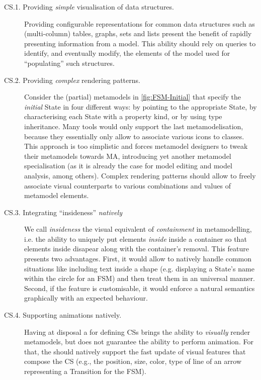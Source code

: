 \begin{description}
   \item[CS.1. Providing \emph{simple} visualisation of data struc\-tures.]
   Pro\-vi\-ding configurable representations for common data structures such as
   (multi-column) tables, graphs, sets and lists present the benefit of rapidly
   presenting information from a model. This ability should rely on queries to
   identify, and eventually modify, the elements of the model used for ``populating''
   such structures. 

	\item[CS.2. Providing \emph{complex} rendering patterns.]
   Consider the (partial) meta\-models in \autoref{fig:FSM-Initial} that
   specify the \emph{initial} \textsf{State} in four different ways: by pointing
   to the appropriate \textsf{State}, by characterising each \textsf{State} with
   a property \textsf{kind}, or by using type inheritance. Many tools would only
   support the last metamodelisation, because they essentially only allow to 
   associate various icons to classes. This approach is too simplistic and forces
   metamodel designers to tweak their metamodels towards MA, introducing yet another
   metamodel specialisation (as it is already the case for model editing and
   model analysis, among others). Complex rendering patterns should allow to freely
   associate visual counterparts to various combinations and values of metamodel
   elements.
   
   \item[CS.3. Integrating ``insideness'' \emph{natively}] We call \emph{insideness}
   the visual equivalent of \emph{containment} in metamodelling, i.e. the ability
   to uniquely put elements \emph{inside} inside a container so that elements 
   inside disapear along with the container's removal. This feature presents two
   advantages. First, it would allow to natively handle common situations like 
   including text inside a shape (e.g. displaying a \textsf{State}'s name within
   the circle for an \textsf{FSM}) and then treat them in an universal manner. 
   Second, if the feature is customisable, it would enforce a natural semantics
   graphically with an expected behaviour. 
   
   \item[CS.4. Supporting animations natively.] Having at disposal a \DSL
   for defining CSs brings the ability to \emph{visually} render metamodels, but
   does not guarantee the ability to perform animation. For that, the \DSL should
   natively support the fast update of visual features that compose the CS (e.g.,
   the position, size, color, type of line of an arrow representing a 
   \textsf{Transition} for the \textsf{FSM}).      
\end{description}



